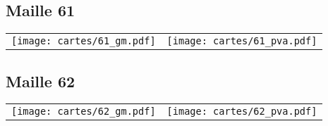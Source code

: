 \subsection{Maille 61}
\begin{tabular}{ll}
\texttt{[image: cartes/61\_gm.pdf]}
&
\texttt{[image: cartes/61\_pva.pdf]}
\end{tabular}
\newpage
\subsection{Maille 62}
\begin{tabular}{ll}
\texttt{[image: cartes/62\_gm.pdf]}
&
\texttt{[image: cartes/62\_pva.pdf]}
\end{tabular}
\newpage
